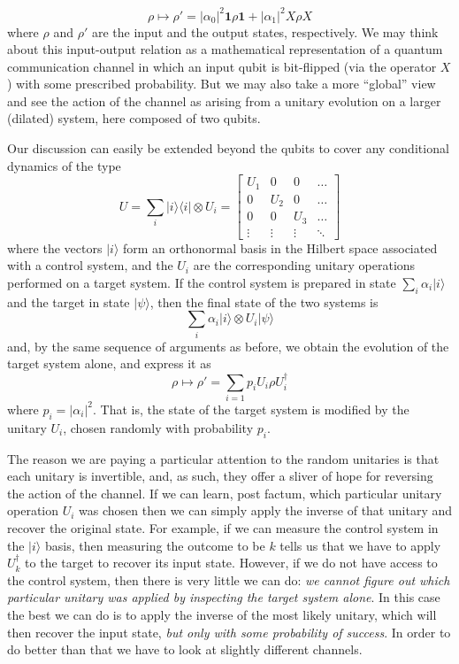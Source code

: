 \documentclass[fleqn]{article}
\begin{document}
\[
  \rho\longmapsto
  \rho'= |\alpha_0|^2 \mathbf{1}\rho\mathbf{1}+ |\alpha_1|^2 X\rho X
\]
where \(\rho\) and \(\rho'\) are the input and the output states, respectively.
We may think about this input-output relation as a mathematical representation of a quantum communication channel in which an input qubit is bit-flipped (via the operator \(X\)) with some prescribed probability.
But we may also take a more ``global'' view and see the action of the channel as arising from a unitary evolution on a larger (dilated) system, here composed of two qubits.

Our discussion can easily be extended beyond the qubits to cover any conditional dynamics of the type
\[
  U
  = \sum_i |i\rangle\langle i|\otimes U_i
  =
  \begin{bmatrix}
    U_1 & 0 & 0 & \ldots
  \\0 & U_2 & 0 & \ldots
  \\0 & 0 & U_3 & \ldots
  \\\vdots & \vdots &\vdots & \ddots
  \end{bmatrix}
\]
where the vectors \(|i\rangle\) form an orthonormal basis in the Hilbert space associated with a control system, and the \(U_i\) are the corresponding unitary operations performed on a target system.
If the control system is prepared in state \(\sum_i\alpha_i|i\rangle\) and the target in state \(|\psi\rangle\), then the final state of the two systems is
\[
  \sum_i \alpha_i|i\rangle\otimes U_i|\psi\rangle
\]
and, by the same sequence of arguments as before, we obtain the evolution of the target system alone, and express it as
\[
  \rho\longmapsto
  \rho' = \sum_{i=1} p_i U_i \rho U^\dagger_i
\]
where \(p_i=|\alpha_i|^2\).
That is, the state of the target system is modified by the unitary \(U_i\), chosen randomly with probability \(p_i\).

The reason we are paying a particular attention to the random unitaries is that each unitary is invertible, and, as such, they offer a sliver of hope for reversing the action of the channel.
If we can learn, post factum, which particular unitary operation \(U_i\) was chosen then we can simply apply the inverse of that unitary and recover the original state.
For example, if we can measure the control system in the \(|i\rangle\) basis, then measuring the outcome to be \(k\) tells us that we have to apply \(U_k^\dagger\) to the target to recover its input state.
However, if we do not have access to the control system, then there is very little we can do: \emph{we cannot figure out which particular unitary was applied by inspecting the target system alone}.
In this case the best we can do is to apply the inverse of the most likely unitary, which will then recover the input state, \emph{but only with some probability of success}.
In order to do better than that we have to look at slightly different channels.
\end{document}
